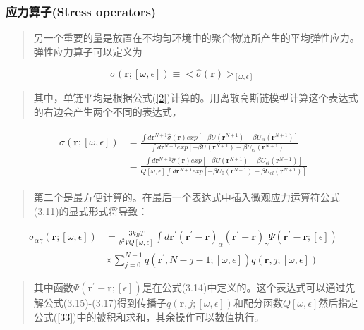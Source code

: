 \subsubsection{应力算子(Stress operators)}
\begin{quotation}
另一个重要的量是放置在不均匀环境中的聚合物链所产生的平均弹性应力。弹性应力算子可以定义为
\end{quotation}
\begin{equation}\label{31}
\sigma(\mathbf{\mathbf{r}};[\omega,\epsilon])\equiv<\hat{\sigma}(\mathbf{r})>_{[\omega,\epsilon]}
\end{equation}
\begin{quotation}
其中，单链平均是根据公式(\ref{2})计算的。用离散高斯链模型计算这个表达式的右边会产生两个不同的表达式，
\end{quotation}
\begin{align}\label{32}
\begin{split}
\sigma(\mathbf{r};[\omega,\epsilon])&=\frac{\int d\mathbf{r}^{N+1}\hat{\sigma}(\mathbf{r})exp[-\beta U(\mathbf{r}^{N+1})-\beta U_{el}(\mathbf{r}^{N+1})]}{\int d\mathbf{r}^{N+1}exp[-\beta U(\mathbf{r}^{N+1})-\beta U_{el}(\mathbf{r}^{N+1})]}\\&=\frac{\int d\mathbf{r}^{N+1}\hat{\sigma}(\mathbf{r})exp[-\beta U(\mathbf{r}^{N+1})-\beta U_{el}(\mathbf{r}^{N+1})]}{Q[\omega,\epsilon]\int d\mathbf{r}^{N+1}exp[-\beta U_0(\mathbf{r}^{N+1})-\beta U_{el}(\mathbf{r}^{N+1})]}
\end{split}
\end{align}
\begin{quotation}
第二个是最方便计算的。在最后一个表达式中插入微观应力运算符公式(3.11)的显式形式将导致：
\end{quotation}
\begin{equation}
\begin{aligned}\label{33}
\sigma_{\alpha \gamma}(\mathbf{r};[\omega,\epsilon])&=\frac{3k_BT}{b^2VQ[\omega,\epsilon]} \int d\mathbf{r}^{'}(\mathbf{r}^{'}-\mathbf{r})_{\alpha} (\mathbf{r}^{'}-\mathbf{r})_{\gamma} \varPsi (\mathbf{r}^{'}-\mathbf{r};[\epsilon])\\&\times \sum_{j=0}^{N-1}q(\mathbf{r}^{'},N-j-1;[\omega,\epsilon])q(\mathbf{r},j;[\omega,\epsilon])
\end{aligned}
\end{equation}
\begin{quotation}
其中函数$\varPsi (\mathbf{r}^{'}-\mathbf{r};[\epsilon])$是在公式(3.14)中定义的。这个表达式可以通过先解公式(3.15)-(3.17)得到传播子$q(\mathbf{r},j;[\omega,\epsilon])$和配分函数$Q[\omega,\epsilon]$然后指定公式(\ref{33})中的被积和求和，其余操作可以数值执行。
\end{quotation}
